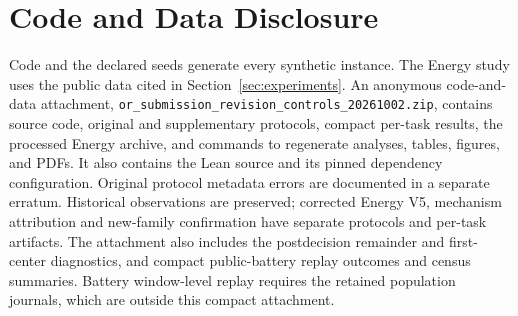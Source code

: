 \section{Code and Data Disclosure}\label{sec:code-data}

Code and the declared seeds generate every synthetic instance.  The Energy
study uses the public data cited in Section~\ref{sec:experiments}.  An
anonymous code-and-data attachment, \nolinkurl{or_submission_revision_controls_20261002.zip},
contains source code, original and supplementary protocols, compact
per-task results, the processed Energy archive, and commands to regenerate
analyses, tables, figures, and PDFs.  It also contains the Lean source and
its pinned dependency configuration.  Original protocol metadata errors are
documented in a separate erratum.  Historical observations are preserved;
corrected Energy V5, mechanism attribution and new-family confirmation have
separate protocols and per-task artifacts.
The attachment also includes the postdecision remainder and first-center
diagnostics, and compact public-battery replay outcomes and census summaries.
Battery window-level replay requires the retained population journals, which
are outside this compact attachment.
